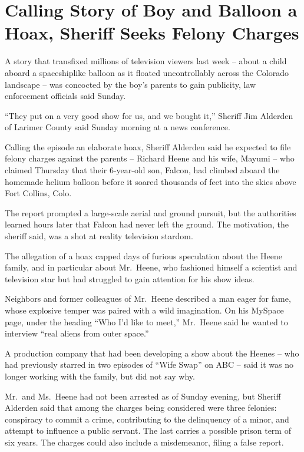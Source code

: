 ﻿\documentclass[12pt]{article}
\begin{document}
\section{Calling Story of Boy and Balloon a Hoax, Sheriff Seeks Felony Charges}

\lettrine{A}{} story that transfixed millions of television viewers last
week -- about a child aboard a spaceshiplike balloon as it floated uncontrollably across the
Colorado landscape -- was concocted by the boy's parents to gain publicity, law enforcement
officials said Sunday.

``They put on a very good show for us, and we bought it,'' Sheriff Jim Alderden of Larimer County
said Sunday morning at a news conference.

Calling the episode an elaborate hoax, Sheriff Alderden said he expected to file felony\cite{felony}
charges against the parents -- Richard Heene and his wife, Mayumi -- who claimed Thursday that their
6-year-old son, Falcon, had climbed aboard the homemade helium balloon before it soared thousands of
feet into the skies above Fort Collins, Colo.

The report prompted a large-scale aerial and ground pursuit, but the authorities learned hours later
that Falcon had never left the ground. The motivation, the sheriff said, was a shot at reality
television stardom.

The allegation of a hoax capped days of furious speculation about the Heene family, and in
particular about Mr.~Heene, who fashioned himself a scientist and television star but had struggled
to gain attention for his show ideas.

Neighbors and former colleagues of Mr.~Heene described a man eager for fame, whose explosive temper
was paired with a wild imagination. On his MySpace page, under the heading ``Who I'd like to meet,''
Mr.~Heene said he wanted to interview ``real aliens from outer space.''

A production company that had been developing a show about the Heenes -- who had previously starred
in two episodes of ``Wife Swap'' on ABC -- said it was no longer working with the family, but did
not say why.

Mr.~and Ms.~Heene had not been arrested as of Sunday evening, but Sheriff Alderden said that among
the charges being considered were three felonies: conspiracy to commit a crime, contributing to the
delinquency of a minor, and attempt to influence a public servant. The last carries a possible
prison term of six years. The charges could also include a misdemeanor, filing a false report.
\end{document}
